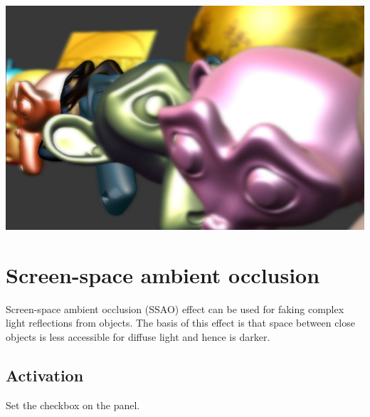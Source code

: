 \documentclass[a4paper,12pt,oneside]{sphinxmanual}
\begin{document}
{\hfill\includegraphics[width=1.000\linewidth]{dof.jpg}\hfill}

\begin{DUlineblock}{0em}
\item[] 
\end{DUlineblock}


\section{Screen-space ambient occlusion}
\label{postprocessing_effects:index-2}\label{postprocessing_effects:ssao}\label{postprocessing_effects:id8}
Screen-space ambient occlusion (SSAO) effect can be used for faking complex light reflections from objects. The basis of this effect is that space between close objects is less accessible for diffuse light and hence is darker.


\subsection{Activation}
\label{postprocessing_effects:id9}
Set the  checkbox on the  panel.
\end{document}
